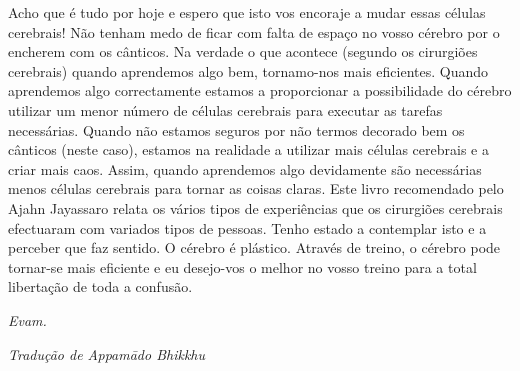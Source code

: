 Acho que é tudo por hoje e espero que isto vos encoraje a mudar essas
células cerebrais! Não tenham medo de ficar com falta de espaço no vosso
cérebro por o encherem com os cânticos. Na verdade o que acontece
(segundo os cirurgiões cerebrais) quando aprendemos algo bem,
tornamo-nos mais eficientes. Quando aprendemos algo correctamente
estamos a proporcionar a possibilidade do cérebro utilizar um menor
número de células cerebrais para executar as tarefas necessárias. Quando
não estamos seguros por não termos decorado bem os cânticos (neste
caso), estamos na realidade a utilizar mais células cerebrais e a criar
mais caos. Assim, quando aprendemos algo devidamente são necessárias
menos células cerebrais para tornar as coisas claras. Este livro
recomendado pelo Ajahn Jayassaro relata os vários tipos de experiências
que os cirurgiões cerebrais efectuaram com variados tipos de pessoas.
Tenho estado a contemplar isto e a perceber que faz sentido. O cérebro é
plástico. Através de treino, o cérebro pode tornar-se mais eficiente e
eu desejo-vos o melhor no vosso treino para a total libertação de toda a
confusão.

\emph{Evam.}

\bigskip

{\raggedleft\itshape
  Tradução de Appamādo Bhikkhu
\par}
